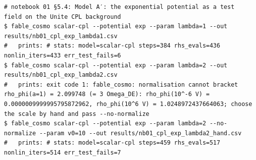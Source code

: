 \begin{Verbatim}
# notebook 01 §5.4: Model A′: the exponential potential as a test field on the Unite CPL background
$ fable_cosmo scalar-cpl --potential exp --param lambda=1 --out results/nb01_cpl_exp_lambda1.csv
#   prints: # stats: model=scalar-cpl steps=384 rhs_evals=436 nonlin_iters=433 err_test_fails=6
$ fable_cosmo scalar-cpl --potential exp --param lambda=2 --out results/nb01_cpl_exp_lambda2.csv
#   prints: exit code 1: fable_cosmo: normalisation cannot bracket rho_phi(a=1) = 2.099748 (= 3 Omega_DE): rho_phi(10^-6 V) = 0.0000009999995795872962, rho_phi(10^6 V) = 1.0248972437664063; choose the scale by hand and pass --no-normalize
$ fable_cosmo scalar-cpl --potential exp --param lambda=2 --no-normalize --param v0=10 --out results/nb01_cpl_exp_lambda2_hand.csv
#   prints: # stats: model=scalar-cpl steps=459 rhs_evals=517 nonlin_iters=514 err_test_fails=7


\end{Verbatim}
